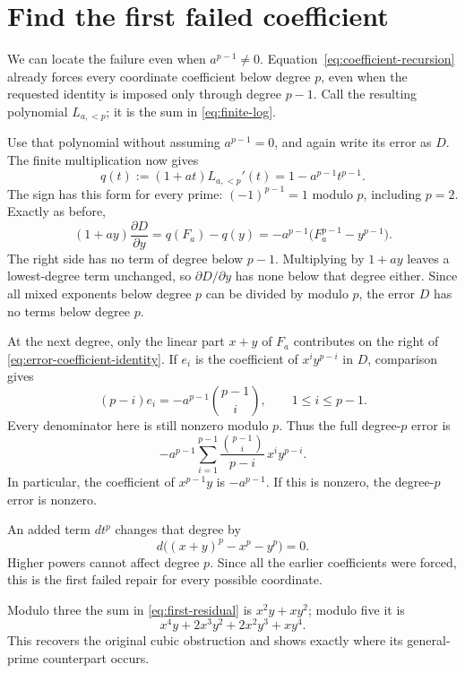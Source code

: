 \documentclass[11pt,letterpaper]{article}
\numberwithin{equation}{section}
\theoremstyle{definition}\newtheorem{example}[theorem]{Example}
\begin{document}
\section{Find the first failed coefficient}\label{sec:first-obstruction}

We can locate the failure even when \(a^{p-1}\ne0\). Equation~\eqref{eq:coefficient-recursion} already forces every coordinate coefficient below degree \(p\), even when the requested identity is imposed only through degree \(p-1\). Call the resulting polynomial \(L_{a,<p}\); it is the sum in \eqref{eq:finite-log}.

Use that polynomial without assuming \(a^{p-1}=0\), and again write its error as \(D\). The finite multiplication now gives
\[
 q(t):=(1+at)L_{a,<p}'(t)=1-a^{p-1}t^{p-1}.
\]
The sign has this form for every prime: \((-1)^{p-1}=1\) modulo \(p\), including \(p=2\). Exactly as before,
\begin{equation}\label{eq:error-coefficient-identity}
 (1+ay)\frac{\partial D}{\partial y}
 =q(F_a)-q(y)
 =-a^{p-1}\bigl(F_a^{p-1}-y^{p-1}\bigr).
\end{equation}
The right side has no term of degree below \(p-1\). Multiplying by \(1+ay\) leaves a lowest-degree term unchanged, so \(\partial D/\partial y\) has none below that degree either. Since all mixed exponents below degree \(p\) can be divided by modulo \(p\), the error \(D\) has no terms below degree \(p\).

At the next degree, only the linear part \(x+y\) of \(F_a\) contributes on the right of \eqref{eq:error-coefficient-identity}. If \(e_i\) is the coefficient of \(x^iy^{p-i}\) in \(D\), comparison gives
\[
 (p-i)e_i=-a^{p-1}\binom{p-1}{i},\qquad 1\le i\le p-1.
\]
Every denominator here is still nonzero modulo \(p\). Thus the full degree-\(p\) error is
\begin{equation}\label{eq:first-residual}
 -a^{p-1}\sum_{i=1}^{p-1}
 \frac{\binom{p-1}{i}}{p-i}\,x^iy^{p-i}.
\end{equation}
In particular, the coefficient of \(x^{p-1}y\) is \(-a^{p-1}\). If this is nonzero, the degree-\(p\) error is nonzero.

An added term \(d t^p\) changes that degree by
\[
 d\bigl((x+y)^p-x^p-y^p\bigr)=0.
\]
Higher powers cannot affect degree \(p\). Since all the earlier coefficients were forced, this is the first failed repair for every possible coordinate.

Modulo three the sum in \eqref{eq:first-residual} is \(x^2y+xy^2\); modulo five it is
\[
 x^4y+2x^3y^2+2x^2y^3+xy^4.
\]
This recovers the original cubic obstruction and shows exactly where its general-prime counterpart occurs.
\end{document}
